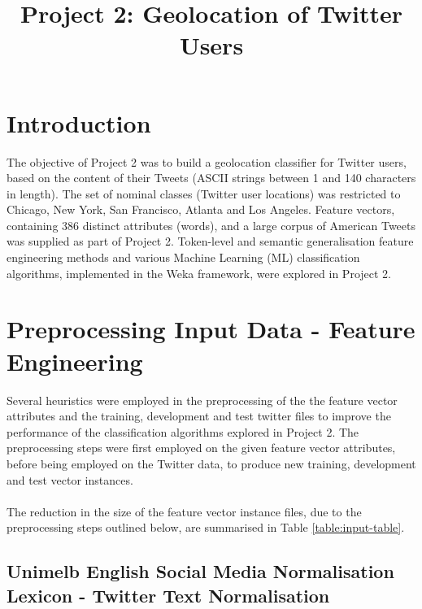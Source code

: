 \documentclass[11pt]{article}
\begin{document}
\title{Project 2: Geolocation of Twitter Users}
\maketitle

\section{Introduction}
The objective of Project 2 was to build a geolocation classifier for Twitter users, based on the content of their Tweets (ASCII strings between 1 and 140 characters in length). The set of nominal classes (Twitter user locations) was restricted to Chicago, New York, San Francisco, Atlanta and Los Angeles. Feature vectors, containing 386 distinct attributes (words), and a large corpus of American Tweets was supplied as part of Project 2. Token-level and semantic generalisation feature engineering methods and various Machine Learning (ML) classification algorithms, implemented in the Weka framework, were explored in Project 2.

\section{Preprocessing Input Data - Feature Engineering}  

Several heuristics were employed in the preprocessing of the the feature vector attributes and the training, development and test twitter files to improve the performance of the classification algorithms explored in Project 2. The preprocessing steps were first employed on the given feature vector attributes, before being employed on the Twitter data, to produce new training, development and test vector instances.\\\\
The reduction in the size of the feature vector instance files, due to the preprocessing steps outlined below, are summarised in Table \ref{table:input-table}.

\subsection{Unimelb English Social Media Normalisation Lexicon - Twitter Text Normalisation}
\label{subsec:normal}
\end{document}
